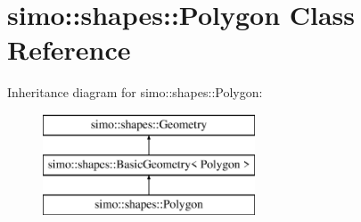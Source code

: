 \hypertarget{classsimo_1_1shapes_1_1_polygon}{\section{simo\-:\-:shapes\-:\-:Polygon Class Reference}
\label{classsimo_1_1shapes_1_1_polygon}
}
Inheritance diagram for simo\-:\-:shapes\-:\-:Polygon\-:\begin{figure}[H]
\begin{center}
\leavevmode
\includegraphics[height=3.000000cm]{classsimo_1_1shapes_1_1_polygon}
\end{center}
\end{figure}
